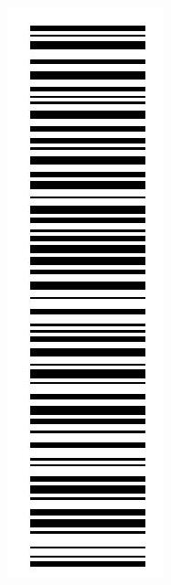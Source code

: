 \documentclass[10pt]{article}
\begin{document}
\begin{enumerate}
\includegraphics[max width=\textwidth, center]{2024_11_21_8bf32a7596bd08ca7a9fg-01(2)}
\end{enumerate}
\end{document}
